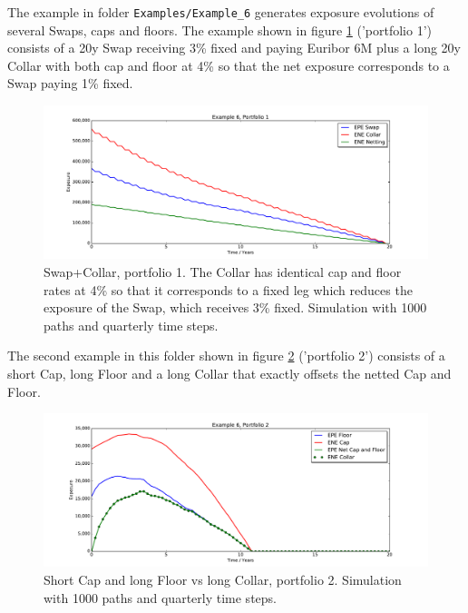 \documentclass[12pt, a4paper]{article}
\begin{document}
The example in folder {\tt Examples/Example\_6} generates exposure evolutions of several Swaps, caps and floors. The
example shown in figure \ref{fig_capfloor_1} ('portfolio 1') consists of a 20y Swap receiving 3\% fixed and paying
Euribor 6M plus a long 20y Collar
with both cap and floor at 4\% so that the net exposure corresponds to a Swap paying 1\% fixed. \\

\begin{figure}[h!]
\begin{center}
\includegraphics[scale=0.45]{mpl_capfloor_1.pdf}
\end{center}
\caption{Swap+Collar, portfolio 1. The Collar has identical cap and floor rates at 4\% so that it corresponds to a
  fixed leg which reduces the exposure of the Swap, which receives 3\% fixed. Simulation with 1000 paths and quarterly
  time steps.}
\label{fig_capfloor_1}
\end{figure}

The second example in this folder shown in figure \ref{fig_capfloor_2} ('portfolio 2') consists of a short Cap, long
Floor and a long Collar that exactly offsets the netted Cap and Floor.

\begin{figure}[h!]
\begin{center}
\includegraphics[scale=0.45]{mpl_capfloor_2.pdf}
\end{center}
\caption{Short Cap and long Floor vs long Collar, portfolio 2. Simulation with 1000 paths and quarterly time steps.}
\label{fig_capfloor_2}
\end{figure}
\end{document}
